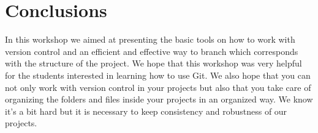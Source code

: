 \section{Conclusions}


In this workshop we aimed at presenting the basic tools on how to work with version control and an efficient and effective way to branch which corresponds with the structure of the project. 
We hope that this workshop was very helpful for the students interested in learning how to use Git.
We also hope that you can not only work with version control in your projects but also that you take care of organizing the folders and files inside your projects in an organized way. We know it's a bit hard but it is necessary to keep consistency and robustness of our projects.
